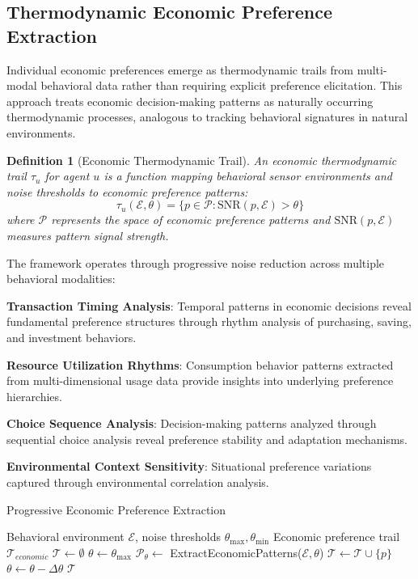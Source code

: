 \documentclass[12pt,a4paper]{article}
\newtheorem{definition}[theorem]{Definition}
\begin{document}
\subsection{Thermodynamic Economic Preference Extraction}

Individual economic preferences emerge as thermodynamic trails from multi-modal behavioral data rather than requiring explicit preference elicitation. This approach treats economic decision-making patterns as naturally occurring thermodynamic processes, analogous to tracking behavioral signatures in natural environments.

\begin{definition}[Economic Thermodynamic Trail]
An economic thermodynamic trail $\tau_u$ for agent $u$ is a function mapping behavioral sensor environments and noise thresholds to economic preference patterns:
\begin{equation}
\tau_u(\mathcal{E}, \theta) = \{p \in \mathcal{P} : \text{SNR}(p, \mathcal{E}) > \theta\}
\end{equation}
where $\mathcal{P}$ represents the space of economic preference patterns and $\text{SNR}(p, \mathcal{E})$ measures pattern signal strength.
\end{definition}

The framework operates through progressive noise reduction across multiple behavioral modalities:

\textbf{Transaction Timing Analysis}: Temporal patterns in economic decisions reveal fundamental preference structures through rhythm analysis of purchasing, saving, and investment behaviors.

\textbf{Resource Utilization Rhythms}: Consumption behavior patterns extracted from multi-dimensional usage data provide insights into underlying preference hierarchies.

\textbf{Choice Sequence Analysis}: Decision-making patterns analyzed through sequential choice analysis reveal preference stability and adaptation mechanisms.

\textbf{Environmental Context Sensitivity}: Situational preference variations captured through environmental correlation analysis.

\begin{algorithm}
\caption{Progressive Economic Preference Extraction}
\begin{algorithmic}[1]
\Require Behavioral environment $\mathcal{E}$, noise thresholds $\theta_{\max}, \theta_{\min}$
\Ensure Economic preference trail $\mathcal{T}_{economic}$
\State $\mathcal{T} \leftarrow \emptyset$
\State $\theta \leftarrow \theta_{\max}$
\While{$\theta \geq \theta_{\min}$}
    \State $\mathcal{P}_\theta \leftarrow$ ExtractEconomicPatterns($\mathcal{E}, \theta$)
            \State $\mathcal{T} \leftarrow \mathcal{T} \cup \{p\}$
        \EndIf
    \EndFor
    \State $\theta \leftarrow \theta - \Delta\theta$
\EndWhile
\Return $\mathcal{T}$
\end{algorithmic}
\end{algorithm}
\end{document}
